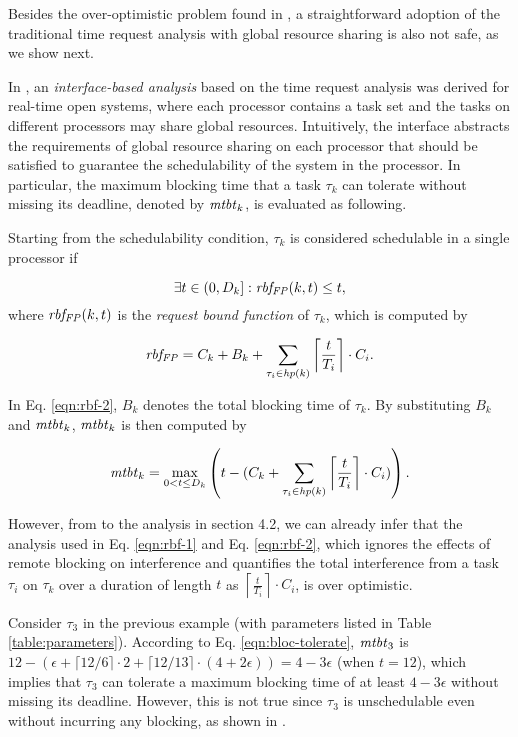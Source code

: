 Besides the over-optimistic problem found in \citep{lakshmanan-2009}, a straightforward adoption of the traditional time request analysis with global resource sharing is also not safe, as we show next.

 In \cite{NBN:11}, an \emph{interface-based analysis} based on the time request analysis was derived for real-time open systems, where each processor contains a task set and the tasks on different processors may share global resources. Intuitively, the interface abstracts the requirements of global resource sharing on each processor that should be satisfied to guarantee the schedulability of the system in the processor. In particular, the maximum blocking time that a task $\tau_k$ can tolerate without missing its deadline, denoted by $\mathit{mtbt}_k$, is evaluated as following. 

Starting from the schedulability condition, $\tau_k$ is considered schedulable in a single processor if

\begin{equation}
\label{eqn:rbf-1}
\exists t \in (0,D_k]: \mathit{rbf_{FP}}(k,t) \leq t, 
\end{equation}
where $\mathit{rbf_{FP}}(k,t)$ is the \emph{request bound function} of $\tau_k$, which is computed by

\begin{equation}
\label{eqn:rbf-2}
\mathit{rbf_{FP}} = C_k + B_k + \sum_{\tau_i \in \mathit{hp}(k)} \left \lceil \frac{t}{T_i} \right \rceil \cdot C_i.
\end{equation}

In Eq. \ref{eqn:rbf-2}, $B_k$ denotes the total blocking time of $\tau_k$. By substituting $B_k$ and $\mathit{mtbt}_k$, $\mathit{mtbt}_k$ is then computed by

\begin{equation}
\label{eqn:bloc-tolerate}
\mathit{mtbt}_k = \max_{0<t \leq D_k} \left( t - ( C_k + \sum_{\tau_i \in \mathit{hp}(k)} \left \lceil \frac{t}{T_i} \right \rceil \cdot C_i ) \right).
\end{equation}

However, from to the analysis in section 4.2, we can already infer that the analysis used in Eq. \ref{eqn:rbf-1} and Eq. \ref{eqn:rbf-2}, which ignores the effects of remote blocking on interference and quantifies the total interference from a task $\tau_i$ on $\tau_k$ over a duration of length $t$ as $\left \lceil \frac{t}{T_i} \right \rceil \cdot C_i$, is over optimistic. 

Consider $\tau_3$ in the previous example (with parameters listed in Table \ref{table:parameters}). According to Eq. \ref{eqn:bloc-tolerate}, $\mathit{mtbt}_3$ is $12 - (\epsilon + \lceil 12 / 6 \rceil \cdot 2 + \lceil 12 / 13 \rceil \cdot (4+2\epsilon)) = 4-3\epsilon$ (when $t=12$), which implies that $\tau_3$ can tolerate a maximum blocking time of at least $4-3\epsilon$ without missing its deadline. However, this is not true since $\tau_3$ is unschedulable even without incurring any blocking, as shown in .

